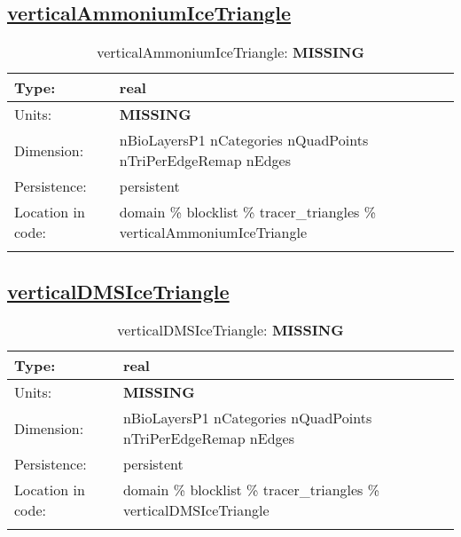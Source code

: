 \subsection[verticalAmmoniumIceTriangle]{\hyperref[sec:var_tab_tracer_triangles]{verticalAmmoniumIceTriangle}}
\label{subsec:var_sec_tracer_triangles_verticalAmmoniumIceTriangle}
\begin{center}
\begin{longtable}{| p{2.0in} | p{4.0in} |}
        \hline 
        Type: & real \\
        \hline 
        Units: & {\bf \color{red} MISSING} \\
        \hline 
        Dimension: & nBioLayersP1 nCategories nQuadPoints nTriPerEdgeRemap nEdges \\
        \hline 
        Persistence: & persistent \\
        \hline 
         Location in code: & domain \% blocklist \% tracer\_triangles \% verticalAmmoniumIceTriangle \\
         \hline 
    \caption{verticalAmmoniumIceTriangle: {\bf \color{red} MISSING}}
\end{longtable}
\end{center}
\subsection[verticalDMSIceTriangle]{\hyperref[sec:var_tab_tracer_triangles]{verticalDMSIceTriangle}}
\label{subsec:var_sec_tracer_triangles_verticalDMSIceTriangle}
\begin{center}
\begin{longtable}{| p{2.0in} | p{4.0in} |}
        \hline 
        Type: & real \\
        \hline 
        Units: & {\bf \color{red} MISSING} \\
        \hline 
        Dimension: & nBioLayersP1 nCategories nQuadPoints nTriPerEdgeRemap nEdges \\
        \hline 
        Persistence: & persistent \\
        \hline 
         Location in code: & domain \% blocklist \% tracer\_triangles \% verticalDMSIceTriangle \\
         \hline 
    \caption{verticalDMSIceTriangle: {\bf \color{red} MISSING}}
\end{longtable}
\end{center}
